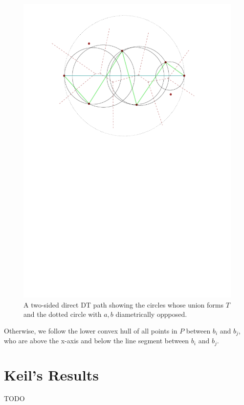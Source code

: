\documentclass{tufte-handout}
\begin{document}
\begin{figure}
  \includegraphics[scale=1.0]{figures/two_sided_path_center_circles.pdf}
  \caption{A two-sided direct DT path showing the circles whose union
    forms $T$ and the dotted circle with $a,b$ diametrically
    oppposed.}
\end{figure}

Otherwise, we follow the lower convex hull of all points in $P$
between $b_i$ and $b_j$, who are above the x-axis and below the line
segment between $b_i$ and $b_j$.

\newpage
\part{Keil's Results}

TODO


\newpage

\end{document}
